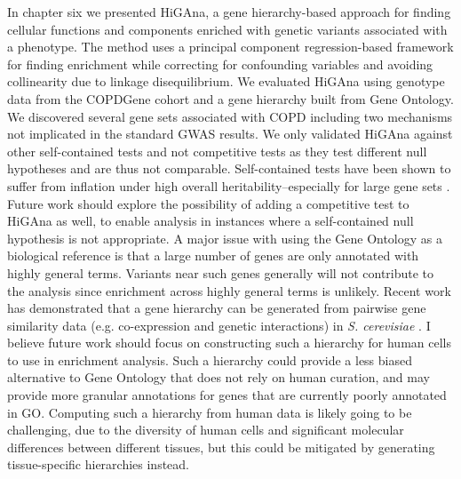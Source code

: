 In chapter six we presented HiGAna, a gene hierarchy-based approach for finding cellular functions and components enriched with genetic variants associated with a phenotype. The method uses a principal component regression-based framework for finding enrichment while correcting for confounding variables and avoiding collinearity due to linkage disequilibrium. We evaluated HiGAna using genotype data from the COPDGene cohort and a gene hierarchy built from Gene Ontology. We discovered several gene sets associated with COPD including two mechanisms not implicated in the standard GWAS results.
We only validated HiGAna against other self-contained tests and not competitive tests as they test different null hypotheses and are thus not comparable.
Self-contained tests have been shown to suffer from inflation under high overall heritability--especially for large gene sets \cite{Leeuw2016}. Future work should explore the possibility of adding a competitive test to HiGAna as well, to enable analysis in instances where a self-contained null hypothesis is not appropriate.
A major issue with using the Gene Ontology as a biological reference is that a large number of genes are only annotated with highly general terms. Variants near such genes generally will not contribute to the analysis since enrichment across highly general terms is unlikely. Recent work has demonstrated that a gene hierarchy can be generated from pairwise gene similarity data (e.g. co-expression and genetic interactions) in \emph{S. cerevisiae} \cite{Dutkowski2012,Kramer2014}. I believe future work should focus on constructing such a hierarchy for human cells to use in enrichment analysis. Such a hierarchy could provide a less biased alternative to Gene Ontology that does not rely on human curation, and may provide more granular annotations for genes that are currently poorly annotated in GO. Computing such a hierarchy from human data is likely going to be challenging, due to the diversity of human cells and significant molecular differences between different tissues, but this could be mitigated by generating tissue-specific hierarchies instead.

